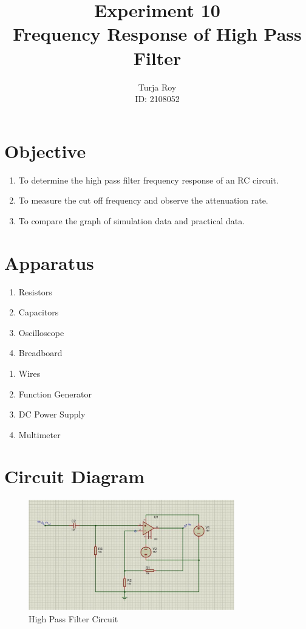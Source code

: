 \documentclass[12pt]{article}
\title{
    \textbf{Experiment 10} \\
    \textbf{Frequency Response of High Pass Filter}
}
\author{
    Turja Roy \\
    ID: 2108052
}
\date{}
\begin{document}
\maketitle

\section{Objective}
\begin{enumerate}
    \item To determine the high pass filter frequency response of an RC circuit.
    \item To measure the cut off frequency and observe the attenuation rate.
    \item To compare the graph of simulation data and practical data.
\end{enumerate}

\section{Apparatus}
\begin{multicols}{2}
    \begin{enumerate}
        \item Resistors
        \item Capacitors
        \item Oscilloscope
        \item Breadboard
    \end{enumerate}
    \columnbreak
    \begin{enumerate}
        \item Wires
        \item Function Generator
        \item DC Power Supply
        \item Multimeter
    \end{enumerate}
\end{multicols}

\section{Circuit Diagram}
\begin{figure}[h]
    \centering
    \includegraphics[width=0.8\textwidth]{HPF.png}
    \caption{High Pass Filter Circuit}
\end{figure}
\end{document}

